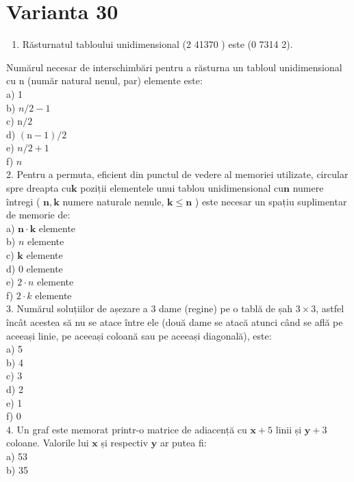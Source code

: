 \section*{Varianta 30}
\begin{enumerate}
  \item Răsturnatul tabloului unidimensional (2 41370 ) este (0 7314 2).
\end{enumerate}

Numărul necesar de interschimbări pentru a răsturna un tabloul unidimensional cu n (număr natural nenul, par) elemente este:\\
a) 1\\
b) $n / 2-1$\\
c) $\mathrm{n} / 2$\\
d) $(\mathrm{n}-1) / 2$\\
e) $n / 2+1$\\
f) $n$\\
2. Pentru a permuta, eficient din punctul de vedere al memoriei utilizate, circular spre dreapta $\mathrm{cu} \mathbf{k}$ poziții elementele unui tablou unidimensional $\mathrm{cu} \mathbf{n}$ numere întregi ( $\mathbf{n}, \mathbf{k}$ numere naturale nenule, $\mathbf{k} \leq \mathbf{n}$ ) este necesar un spațiu suplimentar de memorie de:\\
a) $\mathbf{n} \cdot \mathbf{k}$ elemente\\
b) $n$ elemente\\
c) $\mathbf{k}$ elemente\\
d) 0 elemente\\
e) $2 \cdot n$ elemente\\
f) $2 \cdot k$ elemente\\
3. Numărul soluțiilor de așezare a 3 dame (regine) pe o tablă de șah $3 \times 3$, astfel încât acestea să nu se atace între ele (două dame se atacă atunci când se află pe aceeași linie, pe aceeași coloană sau pe aceeași diagonală), este:\\
a) 5\\
b) 4\\
c) 3\\
d) 2\\
e) 1\\
f) 0\\
4. Un graf este memorat printr-o matrice de adiacență cu $\mathbf{x}+5$ linii și $\mathbf{y}+3$ coloane. Valorile lui $\mathbf{x}$ și respectiv $\mathbf{y}$ ar putea fi:\\
a) 53\\
b) 35\\
